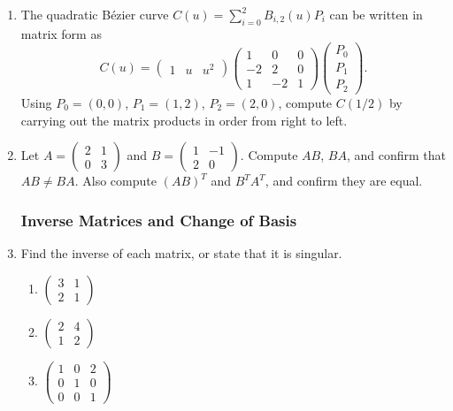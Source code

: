 \begin{enumerate}
\item The quadratic B\'{e}zier curve $C(u) = \sum_{i=0}^2 B_{i,2}(u) P_i$ can be
written in matrix form as
\[
  C(u) = \begin{pmatrix} 1 & u & u^2 \end{pmatrix}
         \begin{pmatrix} 1 & 0 & 0 \\ -2 & 2 & 0 \\ 1 & -2 & 1 \end{pmatrix}
         \begin{pmatrix} P_0 \\ P_1 \\ P_2 \end{pmatrix}.
\]
Using $P_0 = (0,0)$, $P_1 = (1,2)$, $P_2 = (2,0)$, compute $C(1/2)$
by carrying out the matrix products in order from right to left.

\item Let
$A = \begin{pmatrix} 2 & 1 \\ 0 & 3 \end{pmatrix}$
and
$B = \begin{pmatrix} 1 & -1 \\ 2 & 0 \end{pmatrix}$.
Compute $AB$, $BA$, and confirm that $AB \neq BA$.
Also compute $(AB)^T$ and $B^T A^T$, and confirm they are equal.

\subsubsection*{Inverse Matrices and Change of Basis}

\item Find the inverse of each matrix, or state that it is singular.
\begin{enumerate}
  \item $\begin{pmatrix} 3 & 1 \\ 2 & 1 \end{pmatrix}$

  \item $\begin{pmatrix} 2 & 4 \\ 1 & 2 \end{pmatrix}$

  \item $\begin{pmatrix} 1 & 0 & 2 \\ 0 & 1 & 0 \\ 0 & 0 & 1 \end{pmatrix}$
\end{enumerate}


\end{enumerate}
